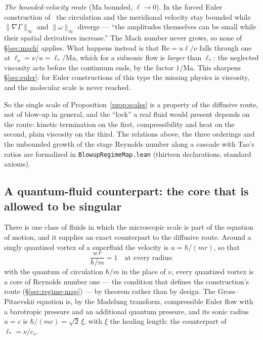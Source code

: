 \documentclass[11pt,a4paper]{article}
\begin{document}
\emph{The bounded-velocity route} ($\mathrm{Ma}$ bounded, $\ell\to0$). In the forced Euler
construction of~\cite{EulerSmoothForcing2026} the circulation and the meridional velocity stay
bounded while $\|\nabla\Gamma\|_\infty$ and $\|\omega\|_\infty$ diverge --- ``the amplitudes
themselves can be small while their spatial derivatives increase.'' The Mach number never grows, so
none of \S\ref{sec:mach} applies. What happens instead is that $\mathrm{Re}=u\ell/\nu$ falls through
one at $\ell_\nu=\nu/u=\ell_*/\mathrm{Ma}$, which for a subsonic flow is \emph{larger} than $\ell_*$:
the neglected viscosity acts before the continuum ends, by the factor $1/\mathrm{Ma}$. This sharpens
\S\ref{sec:euler}: for Euler constructions of this type the missing physics is viscosity, and the
molecular scale is never reached.

So the single scale of Proposition~\ref{prop:scales} is a property of the diffusive route, not of
blow-up in general, and the ``lock'' a real fluid would present depends on the route: kinetic
termination on the first, compressibility and heat on the second, plain viscosity on the third. The
relations above, the three orderings and the unbounded growth of the stage Reynolds number along a
cascade with Tao's ratios are formalized in \texttt{BlowupRegimeMap.lean} (thirteen declarations,
standard axioms).

\subsection{A quantum-fluid counterpart: the core that is allowed to be singular}
\label{sec:quantum}

There is one class of fluids in which the microscopic scale is part of the equation of motion, and
it supplies an exact counterpart to the diffusive route. Around a singly quantized vortex of a
superfluid the velocity is $u=\hbar/(mr)$, so that
\begin{equation}
  \frac{u\,r}{\hbar/m}=1\quad\text{at every radius:}
  \label{eq:quantum-re}
\end{equation}
with the quantum of circulation $\hbar/m$ in the place of $\nu$, every quantized vortex is a core of
Reynolds number one --- the condition that defines the construction's route
(\S\ref{sec:regime-map}) --- by theorem rather than by design. The Gross--Pitaevskii equation is, by
the Madelung transform, compressible Euler flow with a barotropic pressure and an additional quantum
pressure, and its sonic radius $u=c$ is $\hbar/(mc)=\sqrt2\,\xi$, with $\xi$ the healing length: the
counterpart of $\ell_*=\nu/c_s$.
\end{document}
